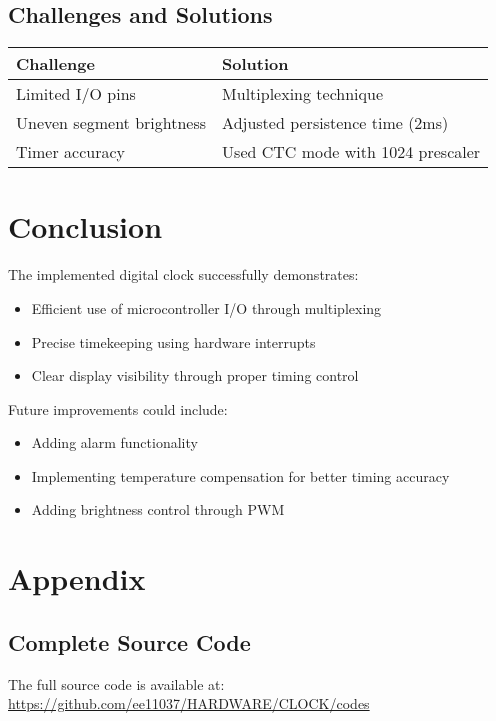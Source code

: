 \documentclass{article}
\begin{document}
\subsection{Challenges and Solutions}
\begin{tabularx}{\linewidth}{|l|X|}
\hline
\textbf{Challenge} & \textbf{Solution} \\ \hline
Limited I/O pins & Multiplexing technique \\ \hline
Uneven segment brightness & Adjusted persistence time (2ms) \\ \hline
Timer accuracy & Used CTC mode with 1024 prescaler \\ \hline
\end{tabularx}

\section{Conclusion}
The implemented digital clock successfully demonstrates:
\begin{itemize}
\item Efficient use of microcontroller I/O through multiplexing
\item Precise timekeeping using hardware interrupts
\item Clear display visibility through proper timing control
\end{itemize}

Future improvements could include:
\begin{itemize}
\item Adding alarm functionality
\item Implementing temperature compensation for better timing accuracy
\item Adding brightness control through PWM
\end{itemize}

\section*{Appendix}
\subsection*{Complete Source Code}
The full source code is available at: \\
\url{https://github.com/ee11037/HARDWARE/CLOCK/codes}
\end{document}
